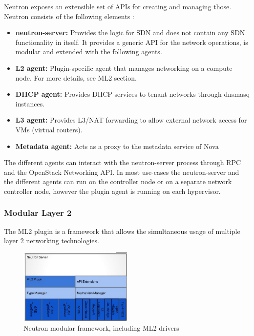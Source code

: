 Neutron exposes an extensible set of APIs for creating and managing those. Neutron consists of the following elements \cite{openstack-training}:
\begin{itemize}
\item \textbf{neutron-server:} Provides the logic for SDN and does not contain any SDN functionality in itself. It provides a generic API for the network operations, is modular and extended with the following agents.
\item \textbf{L2 agent:} Plugin-specific agent that manages networking on a compute node. For more details, see ML2 section.
\item \textbf{DHCP agent:} Provides DHCP services to tenant networks through dnsmasq instances.
\item \textbf{L3 agent:} Provides L3/NAT forwarding to allow external network access for VMs (virtual routers).
\item \textbf{Metadata agent:} Acts as a proxy to the metadata service of Nova
\end{itemize}

The different agents can interact with the neutron-server process through RPC and the OpenStack Networking API. In most use-cases the neutron-server and the different agents can run on the controller node or on a separate network controller node, however the plugin agent is running on each hypervisor.


\subsubsection{Modular Layer 2}

The ML2 plugin is a framework that allows the simultaneous usage of multiple layer 2 networking technologies.

\begin{figure}[H]
\centering
\includegraphics[width=0.5\textwidth]{images/fundamentals/neutron_ml2.png}
\caption{Neutron modular framework, including ML2 drivers}
\end{figure}

